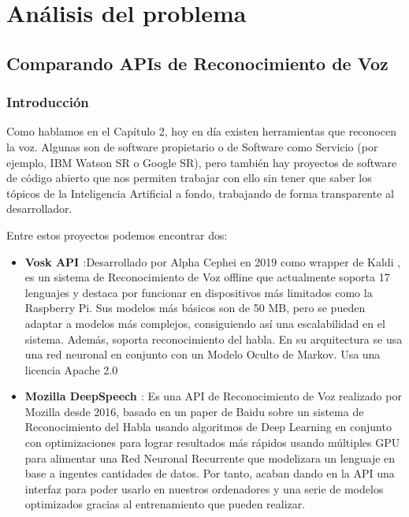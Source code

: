 \chapter{Análisis del problema}

\noindent{}

\section{Comparando APIs de Reconocimiento de Voz}
\subsection{Introducción}
Como hablamos en el Capítulo 2, hoy en día existen herramientas que reconocen la voz. Algunas son de software propietario o de Software como Servicio (por ejemplo, IBM Watson SR o Google SR), pero también hay proyectos de software de código abierto que nos permiten trabajar con ello sin tener que saber los tópicos de la Inteligencia Artificial a fondo, trabajando de forma transparente al desarrollador. 

Entre estos proyectos podemos encontrar dos:
\begin{itemize}
	\item \textbf{Vosk API \cite{vosk}}:Desarrollado por Alpha Cephei en 2019 como wrapper de Kaldi , es un sistema de Reconocimiento de Voz offline que actualmente soporta 17 lenguajes y destaca por funcionar en dispositivos más limitados como la Raspberry Pi. Sus modelos más básicos son de 50 MB, pero se pueden adaptar a modelos más complejos, consiguiendo así una escalabilidad en el sistema. Además, soporta reconocimiento del habla. En su arquitectura se usa una red neuronal en conjunto con un Modelo Oculto de Markov. Usa una licencia Apache 2.0
	
	\item \textbf{Mozilla DeepSpeech \cite{deepspeech}}: Es una API de Reconocimiento de Voz realizado por Mozilla desde 2016, basado en un paper de Baidu sobre un sistema de Reconocimiento del Habla usando algoritmos de Deep Learning en conjunto con optimizaciones para lograr resultados más rápidos usando múltiples GPU para alimentar una Red Neuronal Recurrente que modelizara un lenguaje en base a ingentes cantidades de datos. Por tanto, acaban dando en la API una interfaz para poder usarlo en nuestros ordenadores y una serie de modelos optimizados gracias al entrenamiento que pueden realizar.
	
\end{itemize}

